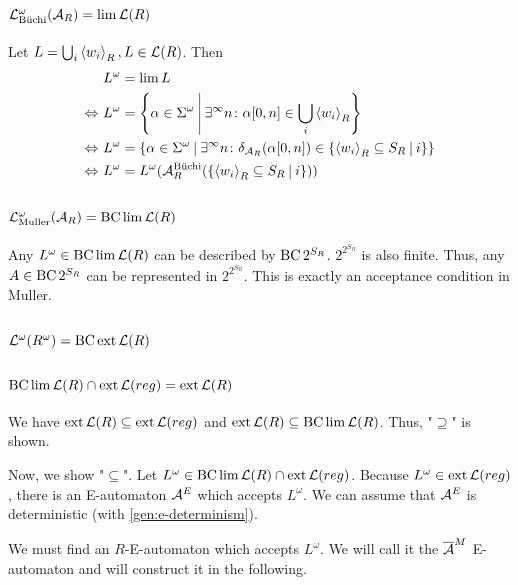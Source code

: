 \subsection{$\mathcal{L}^\omega_{\text{Büchi}}(\mathcal{A}_R) = \lim \mathcal{L}(R)$}
\label{gen:lang_omega_buechi}
Let $L = \bigcup_i \left< w_i\right>_R, L \in \mathcal{L}(R)$. Then
\begin{align*}
& L^\omega = \lim L \\
\Leftrightarrow \ & L^\omega = \Set{\alpha \in \Sigma^\omega}{\exists^\infty n \colon \alpha[0,n] \in \bigcup_i \left< w_i\right>_R} \\
\Leftrightarrow \ & L^\omega = \Set{\alpha \in \Sigma^\omega}{\exists^\infty n \colon \delta_{\A_R}(\alpha[0,n]) \in \Set{\left< w_i\right>_R \subseteq S_R}{i}} \\
\Leftrightarrow \ & L^\omega = L^\omega(\A^{\text{Büchi}}_R(\Set{\left< w_i\right>_R \subseteq S_R}{i}))
\end{align*}

\subsection{$\mathcal{L}^\omega_{\text{Muller}}(\mathcal{A}_R) = \operatorname{BC} \lim \mathcal{L}(R)$}
\label{gen:lang_omega_muller}
Any $L^\omega \in \operatorname{BC} \lim \mathcal{L}(R)$ can be described by $\operatorname{BC} 2^{S_R}$. $2^{2^{S_R}}$ is also finite. Thus, any $A \in \operatorname{BC} 2^{S_R}$ can be represented in $2^{2^{S_R}}$. This is exactly an acceptance condition in Muller.

\subsection{$\mathcal{L}^\omega(R^\omega) = \operatorname{BC} \operatorname{ext} \mathcal{L}(R)$}

\subsection{$\operatorname{BC} \lim \mathcal{L}(R) \cap \operatorname{ext} \mathcal{L}(reg) = \operatorname{ext} \mathcal{L}(R)$}
\label{gen:R-bclim-cap-ext}
We have $\operatorname{ext} \mathcal{L}(R) \subseteq \operatorname{ext} \mathcal{L}(reg)$ and $\operatorname{ext} \mathcal{L}(R) \subseteq \operatorname{BC} \lim \mathcal{L}(R)$. Thus, "$\supseteq$" is shown.

Now, we show "$\subseteq$". Let $L^\omega \in \operatorname{BC} \lim \mathcal{L}(R) \cap \operatorname{ext} \mathcal{L}(reg)$. Because $L^\omega \in \operatorname{ext} \mathcal{L}(reg)$, there is an E-automaton $\mathcal{A}^E$ which accepts $L^\omega$. We can assume that $\mathcal{A}^E$ is deterministic (with \ref{gen:e-determinism}).

We must find an $R$-E-automaton which accepts $L^\omega$. We will call it the $\overline{\mathcal{A}}^M$ E-automaton and will construct it in the following.

